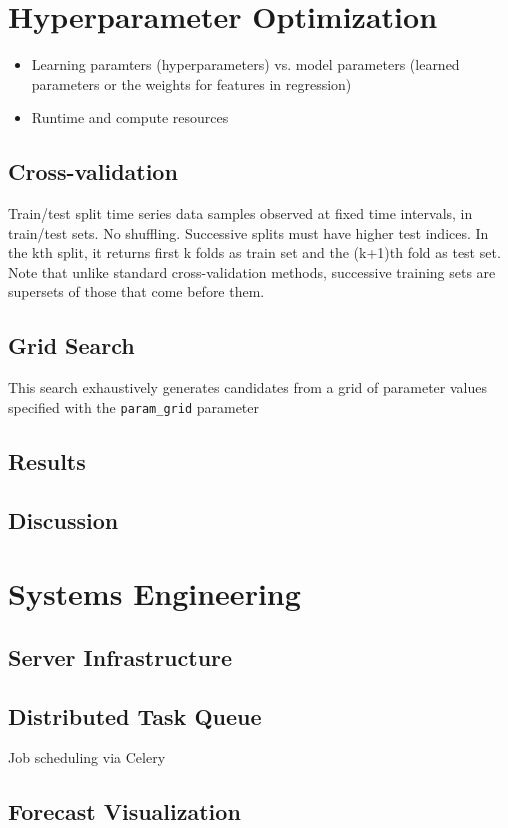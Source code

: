 \documentclass[11pt, oneside]{article}
\begin{document}
\section{Hyperparameter Optimization}
\begin{itemize}
  \item{Learning paramters (hyperparameters) vs. model parameters (learned parameters or the weights for features in regression)}
  \item{Runtime and compute resources}
\end{itemize}

\subsection{Cross-validation}
Train/test split time series data samples observed at fixed time intervals, in train/test sets.
No shuffling. Successive splits must have higher test indices.
In the kth split, it returns first k folds as train set and the (k+1)th fold as test set.
Note that unlike standard cross-validation methods, successive training sets are supersets of those that come before them.
\subsection{Grid Search}
This search exhaustively generates candidates from a grid of parameter values specified with the \texttt{param\_grid} parameter
\subsection{Results}
\subsection{Discussion}

\section{Systems Engineering}
\subsection{Server Infrastructure}
\subsection{Distributed Task Queue}
Job scheduling via Celery
\subsection{Forecast Visualization}
\end{document}
